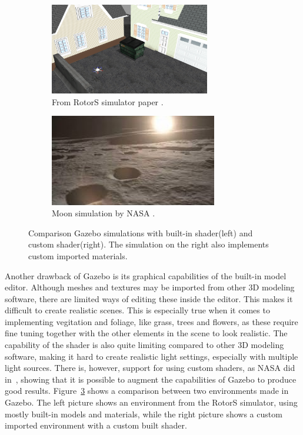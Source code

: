 \begin{figure}[!htb]
    \centering
    \begin{subfigure}{0.45\textwidth}
        \includegraphics[height=4cm]{rapport/fig/Simulator/A-screenshot-of-the-RotorS-simulator-The-scene-is-built-up-from-Gazebo-default-models.png}
        \caption{From RotorS simulator paper \cite{RotorS}.}
        \label{fig:A}
    \end{subfigure}
    \begin{subfigure}{0.45\textwidth}
        \includegraphics[height=4cm]{rapport/fig/Simulator/gazebomoon.jpg}
        \caption{Moon simulation by NASA \cite{NASAGazeboppt}.}
        \label{fig:NASA_Gazebo_moon}
    \end{subfigure}
    \caption{Comparison Gazebo simulations with built-in shader(left) and custom shader(right). The simulation on the right also implements custom imported materials.}
    \label{fig:Gazebo_imgs}
\end{figure}

Another drawback of Gazebo is its graphical capabilities of the built-in model editor. Although meshes and textures may be imported from other 3D modeling software, there are limited ways of editing these inside the editor. This makes it difficult to create realistic scenes. This is especially true when it comes to implementing vegitation and foliage, like grass, trees and flowers, as these require fine tuning together with the other elements in the scene to look realistic. The capability of the shader is also quite limiting compared to other 3D modeling software, making it hard to create realistic light settings, especially with multiple light sources. There is, however, support for using custom shaders, as NASA did in~\cite{NASAGazeboppt}, showing that it is possible to augment the capabilities of Gazebo to produce good results. Figure~\ref{fig:Gazebo_imgs} shows a comparison between two environments made in Gazebo. The left picture shows an environment from the RotorS simulator, using mostly built-in models and materials, while the right picture shows a custom imported environment with a custom built shader.

